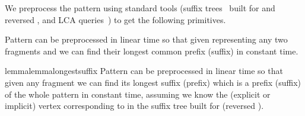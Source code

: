 \documentclass[runningheads]{llncs}
\begin{document}
We preprocess the pattern  using standard tools (suffix trees~\cite{Ukkonen} built for  and reversed , and LCA queries~\cite{BenderLCA}) to get the following primitives.

\begin{lemma}\label{lemma:equality}
Pattern  can be preprocessed in linear time so that given  representing any two fragments  and  we can find their longest common prefix (suffix) in constant time.
\end{lemma}

\begin{restatable}{lemma}{lemmalongestsuffix}
\label{lemma:longest suffix}
Pattern  can be preprocessed in linear time so that given any fragment  we can find its longest suffix (prefix) which is a prefix (suffix) of the whole pattern in constant time, assuming we know the (explicit or implicit) vertex corresponding to  in the suffix tree built for  (reversed ).
\end{restatable}
\end{document}
